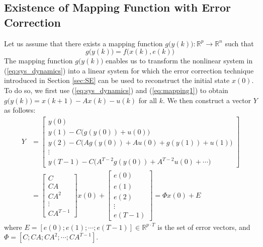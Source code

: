 \subsection{Existence of Mapping Function with Error Correction}\label{map_1}
Let us assume that there exists a mapping function $g\big(y(k)\big): \mathbb{R}^p \rightarrow \mathbb{R}^n$ such that
\begin{equation}\label{eq:mapping1}
g\big(y(k)\big)=f\big(x(k),e(k)\big)~
\end{equation}
The mapping function $g\big(y(k)\big)$ enables us to transform the nonlinear system in (\ref{eq:sys_dynamics}) into a linear system for which the error correction technique introduced in Section \ref{sec:SE} can be used to reconstruct the initial state $x(0)$. To do so, we first use (\ref{eq:sys_dynamics}) and (\ref{eq:mapping1}) to obtain $g\big(y(k)\big)=x(k+1)-A x(k)-u(k)$ for all $k$. We then construct a vector $Y$ as follows:
\begin{equation}\label{map_1_error_correction}
\begin{aligned}
	Y&=\begin{bmatrix} y(0) \\ y(1) - C \big(g(y(0))+ u(0)\big)  \\
	y(2) - C \big( A g(y(0)) + A u(0) + g(y(1) ) + u(1) \big) \\ \vdots   \\
	y(T-1) - C \big(A^{T-2} g(y(0)) + A^{T-2} u(0) + \cdots \big) \end{bmatrix}
	\\&= \begin{bmatrix} C \\ CA \\ CA^2 \\  \vdots \\ CA^{T-1}  \end{bmatrix} x(0) + \begin{bmatrix} e(0) \\ e(1) \\ e(2) \\ \vdots  \\ e(T-1)\end{bmatrix} = \Phi x(0) + E
\end{aligned}
\end{equation}
where $E=[e(0);e(1);\cdots;e(T-1)]\in \mathbb{R}^{p \cdot T}$ is the set of error vectors, and $\Phi=[C;CA;CA^2;\cdots;CA^{T-1}]$.

